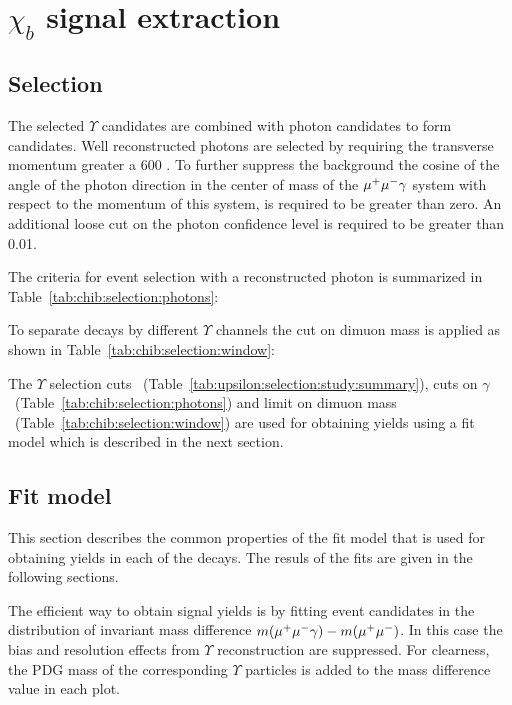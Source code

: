 \section{\texorpdfstring{$\chi_b$}{chib} signal extraction}
\label{sec:chib}

\subsection{Selection}
\label{sec:chib:selection}

The selected $\Upsilon$ candidates  are combined with photon candidates to form
\chib candidates. Well reconstructed photons are selected by requiring the
transverse momentum greater a 600 \mevc. To further suppress the background
the cosine of the angle of the photon direction in the center of mass of the
$\mu^+\mu^-\gamma$ system with respect to the momentum of this system, is required to
be greater than zero. An additional loose cut on the photon confidence level is
required to be greater than 0.01.

The criteria for event selection with a reconstructed photon is summarized in
Table~\ref{tab:chib:selection:photons}:



To separate decays by different $\Upsilon$ channels the cut on dimuon mass is
applied as shown in Table~\ref{tab:chib:selection:window}:



The $\Upsilon$ selection cuts
~(Table~\ref{tab:upsilon:selection:study:summary}), cuts  on $\gamma$
~(Table~\ref{tab:chib:selection:photons}) and limit on dimuon mass
~(Table~\ref{tab:chib:selection:window}) are used for obtaining \chib yields
using a fit model which is described in the next section.


\subsection{Fit model}
\label{sec:chib:fit}

This section describes the common properties of the fit model that is used for
obtaining yields in each of the \chib decays. The resuls of the fits are
given in the following sections.

The efficient way to obtain \chib signal yields is by fitting event candidates
in the distribution of invariant mass difference $m(\mu^+\mu^-\gamma) - m(\mu^+\mu^-)$. In
this case the bias and resolution effects from $\Upsilon$ reconstruction are
suppressed. For clearness, the PDG mass of the corresponding $\Upsilon$
particles is added to the mass difference value in each plot.

